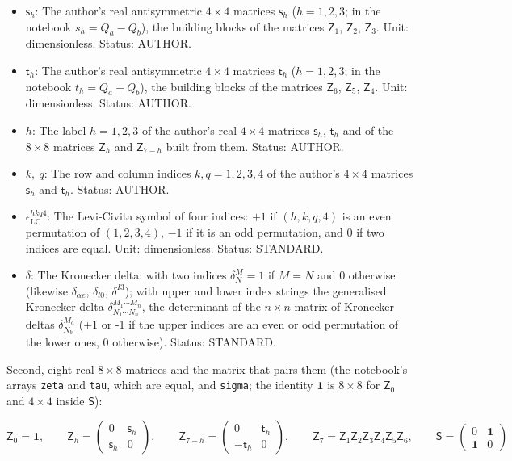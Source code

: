 \documentclass[
  10pt,
]{article}
\providecommand{\tightlist}{%
  \setlength{\itemsep}{0pt}\setlength{\parskip}{0pt}}
\begin{document}
\begin{itemize}
\tightlist
\item
  \(\mathsf{s}_h\): The author's real antisymmetric \(4\times4\)
  matrices \(\mathsf{s}_h\) (\(h = 1, 2, 3\); in the notebook
  \(s_h = Q_a - Q_b\)), the building blocks of the matrices
  \(\mathsf{Z}_1\), \(\mathsf{Z}_2\), \(\mathsf{Z}_3\). Unit:
  dimensionless. Status: AUTHOR.
\item
  \(\mathsf{t}_h\): The author's real antisymmetric \(4\times4\)
  matrices \(\mathsf{t}_h\) (\(h = 1, 2, 3\); in the notebook
  \(t_h = Q_a + Q_b\)), the building blocks of the matrices
  \(\mathsf{Z}_6\), \(\mathsf{Z}_5\), \(\mathsf{Z}_4\). Unit:
  dimensionless. Status: AUTHOR.
\item
  \(h\): The label \(h = 1, 2, 3\) of the author's real \(4\times4\)
  matrices \(\mathsf{s}_h\), \(\mathsf{t}_h\) and of the \(8\times8\)
  matrices \(\mathsf{Z}_h\) and \(\mathsf{Z}_{7-h}\) built from them.
  Status: AUTHOR.
\item
  \(k,\ q\): The row and column indices \(k, q = 1, 2, 3, 4\) of the
  author's \(4\times4\) matrices \(\mathsf{s}_h\) and \(\mathsf{t}_h\).
  Status: AUTHOR.
\item
  \(\epsilon_{\mathrm{LC}}^{hkq4}\): The Levi-Civita symbol of four
  indices: \(+1\) if \((h, k, q, 4)\) is an even permutation of
  \((1, 2, 3, 4)\), \(-1\) if it is an odd permutation, and 0 if two
  indices are equal. Unit: dimensionless. Status: STANDARD.
\item
  \(\delta\): The Kronecker delta: with two indices \(\delta^M_N = 1\)
  if \(M = N\) and 0 otherwise (likewise \(\delta_{\alpha e}\),
  \(\delta_{l0}\), \(\delta^{I3}\)); with upper and lower index strings
  the generalised Kronecker delta
  \(\delta^{M_1\cdots M_n}_{N_1\cdots N_n}\), the determinant of the
  \(n \times n\) matrix of Kronecker deltas \(\delta^{M_a}_{N_b}\) (+1
  or -1 if the upper indices are an even or odd permutation of the lower
  ones, 0 otherwise). Status: STANDARD.
\end{itemize}

Second, eight real \(8\times8\) matrices and the matrix that pairs them
(the notebook's arrays \texttt{zeta} and \texttt{tau}, which are equal,
and \texttt{sigma}; the identity \(\mathbf{1}\) is \(8\times8\) for
\(\mathsf{Z}_0\) and \(4\times4\) inside \(\mathsf{S}\)):

\[
\mathsf{Z}_0 = \mathbf{1},\qquad
\mathsf{Z}_h = \begin{pmatrix}0 & \mathsf{s}_h\\ \mathsf{s}_h & 0\end{pmatrix},\qquad
\mathsf{Z}_{7-h} = \begin{pmatrix}0 & \mathsf{t}_h\\ -\mathsf{t}_h & 0\end{pmatrix},\qquad
\mathsf{Z}_7 = \mathsf{Z}_1\mathsf{Z}_2\mathsf{Z}_3\mathsf{Z}_4\mathsf{Z}_5\mathsf{Z}_6,\qquad
\mathsf{S} = \begin{pmatrix}0 & \mathbf{1}\\ \mathbf{1} & 0\end{pmatrix}
\]
\end{document}
